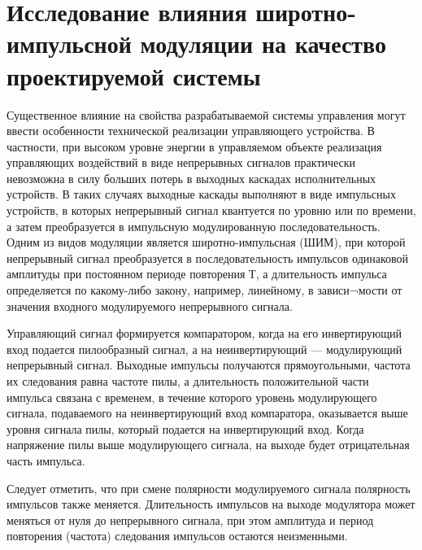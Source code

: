 \section{Исследование влияния широтно-импульсной модуляции на качество проектируемой системы}
Существенное влияние на свойства разрабатываемой системы управления могут ввести особенности технической реализации управляющего устройства. В частности, при высоком уровне энергии в управляемом объекте реализация управляющих воздействий в виде непрерывных сигналов практически невозможна в силу больших потерь в выходных каскадах исполнительных устройств. В таких случаях выходные каскады выполняют в виде импульсных устройств, в которых непрерывный сигнал квантуется по уровню или по времени, а затем преобразуется в импульсную модулированную последовательность. Одним из видов модуляции является широтно-импульсная (ШИМ), при которой непрерывный сигнал преобразуется в последовательность импульсов одинаковой амплитуды при постоянном периоде повторения Т, а длительность импульса определяется по какому-либо закону, например, линейному, в зависи¬мости от значения входного модулируемого непрерывного сигнала.

Управляющий сигнал формируется компаратором, когда на его инвертирующий вход подается пилообразный сигнал, а на неинвертирующий — модулирующий непрерывный сигнал. Выходные импульсы получаются прямоугольными, частота их следования равна частоте пилы, а длительность положительной части импульса связана с временем, в течение которого уровень модулирующего сигнала, подаваемого на неинвертирующий вход компаратора, оказывается выше уровня сигнала пилы, который подается на инвертирующий вход. Когда напряжение пилы выше модулирующего сигнала, на выходе будет отрицательная часть импульса.

Следует отметить, что при смене полярности модулируемого сигнала полярность импульсов также меняется. Длительность импульсов на выходе модулятора может меняться от нуля до непрерывного сигнала, при этом амплитуда и период повторения (частота) следования импульсов остаются неизменными.


